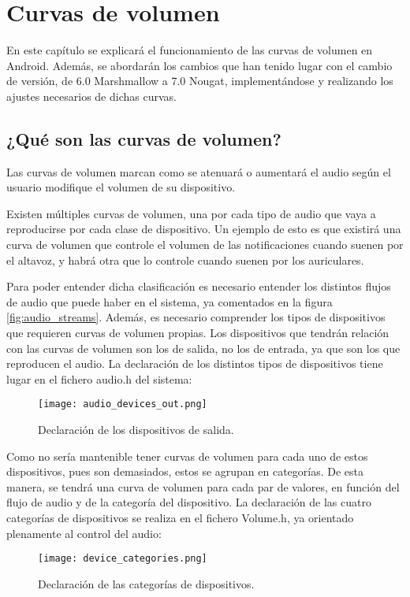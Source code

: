 \chapter{Curvas de volumen} \label{chap:curvas_volumen}
En este capítulo se explicará el funcionamiento de las curvas de volumen en Android. Además, se abordarán los cambios que han tenido lugar con el cambio de versión, de 6.0 Marshmallow a 7.0 Nougat, implementándose y realizando los ajustes necesarios de dichas curvas.

\section{¿Qué son las curvas de volumen?} \label{sec:def_curvas}
Las curvas de volumen marcan como se atenuará o aumentará el audio según el usuario modifique el volumen de su dispositivo.

Existen múltiples curvas de volumen, una por cada tipo de audio que vaya a reproducirse por cada clase de dispositivo. Un ejemplo de esto es que existirá una curva de volumen que controle el volumen de las notificaciones cuando suenen por el altavoz, y habrá otra que lo controle cuando suenen por los auriculares.

Para poder entender dicha clasificación es necesario entender los distintos flujos de audio que puede haber en el sistema, ya comentados en la figura \ref{fig:audio_streams}.
Además, es necesario comprender los tipos de dispositivos que requieren curvas de volumen propias. Los dispositivos que tendrán relación con las curvas de volumen son los de salida, no los de entrada, ya que son los que reproducen el audio. La declaración de los distintos tipos de dispositivos tiene lugar en el fichero audio.h del sistema:

\begin{figure}[H]
	\centering
	\texttt{[image: audio\_devices\_out.png]}
	\caption{Declaración de los dispositivos de salida.}
	\label{fig:audio_devices_out}
\end{figure}

Como no sería mantenible tener curvas de volumen para cada uno de estos dispositivos, pues son demasiados, estos se agrupan en categorías. De esta manera, se tendrá una curva de volumen para cada par de valores, en función del flujo de audio y de la categoría del dispositivo. La declaración de las cuatro categorías de dispositivos se realiza en el fichero Volume.h, ya orientado plenamente al control del audio:

\begin{figure}[H]
	\centering
	\texttt{[image: device\_categories.png]}
	\caption{Declaración de las categorías de dispositivos.}
	\label{fig:device_categories}
\end{figure}

